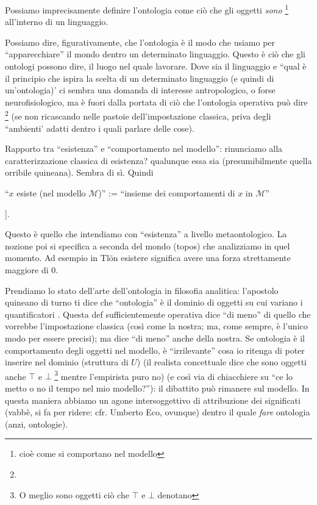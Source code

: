 Possiamo imprecisamente definire l'ontologia come ciò che gli oggetti \emph{sono} \footnote{cioè come si comportano nel modello} all'interno di un linguaggio.

 Possiamo dire, figurativamente, che l'ontologia è il modo che usiamo per ``apparecchiare'' il mondo dentro un determinato linguaggio. Questo è ciò che gli ontologi possono dire, il luogo nel quale lavorare.
 Dove sia il linguaggio e ``qual è il principio che ispira la scelta di un determinato linguaggio (e quindi di un'ontologia)' ci sembra una domanda di interesse antropologico, o forse neurofisiologico, ma è fuori dalla portata di ciò che l'ontologia operativa può dire \footnote{\endde} (se non ricascando nelle pastoie dell'impostazione classica, priva degli ``ambienti' adatti dentro i quali parlare delle cose). 
 
 Rapporto tra ``esistenza'' e ``comportamento nel modello'': rinunciamo alla caratterizzazione classica di esistenza? qualunque essa sia (presumibilmente quella orribile quineana). Sembra di sì. Quindi 
 \begin{center}
 	``$x$ esiste (nel modello $\mathcal{M}$)'' := ``insieme dei comportamenti di $x$ in $\mathcal{M}$''
 \end{center}
  \endde]. 
 
 Questo è quello che intendiamo con ``esistenza'' a livello metaontologico. La nozione poi si specifica a seconda del mondo (topos) che analizziamo in quel momento. Ad esempio in Tl\"on esistere significa avere una forza strettamente maggiore di 0.  

Prendiamo lo stato dell'arte dell'ontologia in filosofia analitica: l'apostolo quineano di turno ti dice che ``ontologia'' è il dominio di oggetti su cui variano i quantificatori \cite{?}. Questa def sufficientemente operativa dice ``di meno'' di quello che vorrebbe l'impostazione classica (così come la nostra; ma, come sempre, è l'unico modo per essere precisi); ma dice ``di meno'' anche della nostra. Se ontologia è il comportamento degli oggetti nel modello, è ``irrilevante'' cosa io ritenga di poter inserire nel dominio (struttura di $U$) (il realista concettuale dice che sono oggetti anche $\top$ e $\bot$ \footnote{O meglio sono oggetti ciò che $\top$ e $\bot$ denotano} mentre l'empirista puro no) (e così via di chiacchiere su ``ce lo metto o no il tempo nel mio modello?''): il dibattito può rimanere sul modello. In questa maniera abbiamo un agone intersoggettivo di attribuzione dei significati (vabbè, si fa per ridere: cfr. Umberto Eco, ovunque) dentro il quale \emph{fare} ontologia (anzi, ontologie).   
